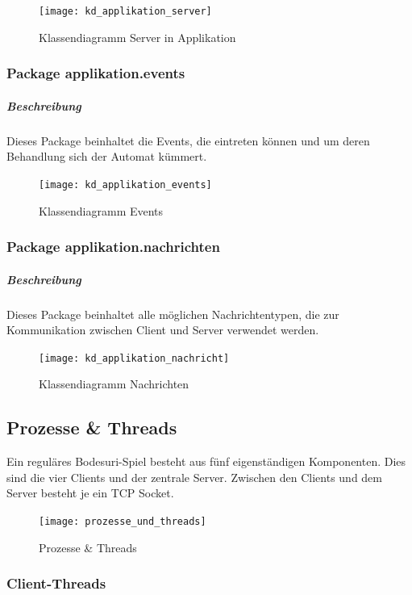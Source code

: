 \documentclass[12pt,halfparskip]{scrartcl}
\begin{document}

\begin{figure}[h]
	\centering
	\texttt{[image: kd\_applikation\_server]}
	\caption{Klassendiagramm Server in Applikation}
	\label{fig:kd_applikation_server}
\end{figure}

\clearpage
\subsubsection{Package applikation.events}
\label{ssub:package_applikation_events}
\subparagraph{Beschreibung}
\label{ssub:beschreibung}
Dieses Package beinhaltet die Events, die eintreten können und um deren Behandlung sich der Automat kümmert.
\begin{figure}[h]
	\centering
	\texttt{[image: kd\_applikation\_events]}
	\caption{Klassendiagramm Events}
	\label{fig:kd_applikation_events}
\end{figure}

\subsubsection{Package applikation.nachrichten}
\label{ssub:package_applikation_nachrichten}
\subparagraph{Beschreibung}
\label{ssub:beschreibung}
Dieses Package beinhaltet alle möglichen Nachrichtentypen, die zur Kommunikation zwischen Client und Server verwendet werden.
\begin{figure}[h]
	\centering
	\texttt{[image: kd\_applikation\_nachricht]}
	\caption{Klassendiagramm Nachrichten}
	\label{fig:kd_applikation_nachricht}
\end{figure}
\clearpage

\subsection{Prozesse \& Threads} %
\label{sub:prozesse_threads}

Ein reguläres Bodesuri-Spiel besteht aus fünf eigenständigen Komponenten. Dies sind die vier Clients und der zentrale Server. Zwischen den Clients und dem Server besteht je ein TCP Socket. 

\begin{figure}[h]
	\centering
	\texttt{[image: prozesse\_und\_threads]}
	\caption{Prozesse \& Threads}
	\label{fig:prozesse_und_threads}
\end{figure}

\clearpage
\subsubsection{Client-Threads} %
\label{ssub:client_threads}
\end{document}
